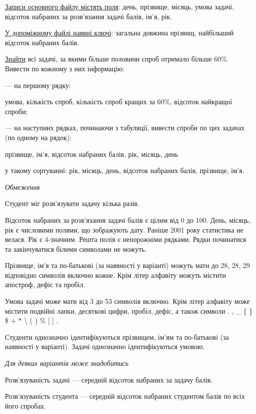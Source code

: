 \documentclass[11pt, ukrainian]{article}
\begin{document}
\underline{Записи основного файлу містять поля}: день, прізвище, місяць, умова задачі, відсоток набраних за розв’язання задачі балів, ім’я, рік.

\underline{У допоміжному файлі наявні ключі}: загальна довжина прізвищ, найбільший відсоток набраних балів.

\underline{Знайти} всі задачі, за якими більше половини спроб отримало більше 60\%. Вивести по кожному з них інформацію:\par
{\noindent}--- на першому рядку:\par
умова, кількість спроб, кількість спроб кращих за 60\%, відсоток найкращої спроби;

{\noindent}--- на наступних рядках, починаючи з табуляції, вивести спроби по цих задачах (по одному на рядок):\par
прізвище, ім’я, відсоток набраних балів, рік, місяць, день

{\noindent}у такому сортуванні: рік, місяць, день, відсоток набраних балів, прізвище, ім’я.


\bigskip\textit{Обмеження}

Студент міг розв’язувати задачу кілька разів.

Відсоток набраних за розв’язання задачі балів є цілим від 0 до 100.
День, місяць, рік є числовими полями, що зображують дату.
Раніше 2001 року статистика не велася. Рік є 4-значним.
Решта полів є непорожніми рядками.
Рядки починатися та закінчуватися білими символами не можуть.

Прізвище, ім’я та по-батькові (за наявності у варіанті) можуть мати до 28, 28, 29 відповідно символів включно кожне. 
Крім літер алфавіту можуть містити апостроф, дефіс та пробіл.

Умова задачі може мати від 3 до 53 символів включно.
Крім літер алфавіту може містити подвійні лапки, десяткові цифри, пробіл, дефіс,
а також символи . , \_ \{ \} \$ $+$ $*$ {\textbackslash} ( ) \% $[$ $]$ .

Студенти однозначно ідентифікуються прізвищем, ім’ям та по-батькові (за наявності у варіанті).
Задачі однозначно ідентифікуються умовою.

\bigskip\textit{Для деяких варіантів може знадобитись}

Розв'язуваність задачі --- середній відсоток набраних за задачу балів.

Розв'язуваність студента --- середній відсоток набраних студентом балів по всіх його спробах.
\end{document}
